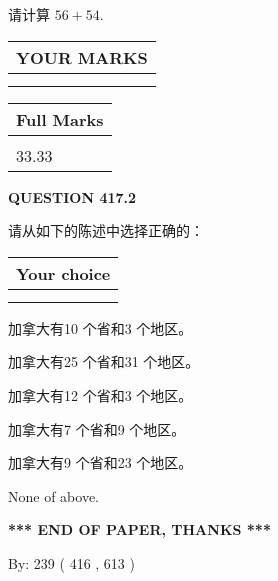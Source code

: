 \documentclass{ctexart}
\begin{document}
  
 
请计算 $ %
56 +  %
54 $.
 

 

 
  
\vspace{0.2in}
  
\noindent\begin{tabular}{|l|}
\hline
 YOUR MARKS  \\
\hline
 \\ 
 \\ 
\hline
\end{tabular}
\hspace{0.05in} \begin{tabular}{|l|}
\hline
 Full Marks  \\
\hline
 \\ 
33.33 \\
\hline
\end{tabular}
{\textbf{\Large{QUESTION
417.2 
}}}
  
  
请从如下的陈述中选择正确的：
  
  
\noindent\hspace{3.0in} \begin{tabular}{|l|}
\hline
Your choice \\
\hline
 \\ 
 \\ 
\hline
\end{tabular}
  
  
 
 
加拿大有10 个省和3 个地区。
 
 
加拿大有25 个省和31 个地区。
 
 
加拿大有12 个省和3 个地区。
 
 
加拿大有7 个省和9 个地区。
 
 
加拿大有9 个省和23 个地区。
 
 
 None of above.
 
 
   
   
 \vspace{0.2in}
 
   
   
   
   
\vspace{1.0in} 
{\textbf{\large{ *** END OF PAPER, THANKS *** }}} 
   
   
\hspace{1.0in} By: 
 239 ( 416 ,  613 )
   
\end{document}

